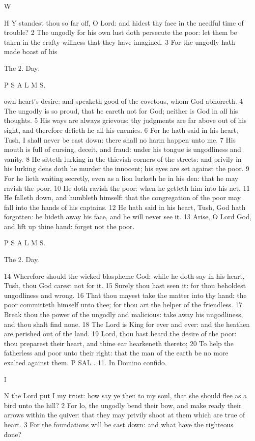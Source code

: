 W

H Y standest thou so far off, O Lord: and hidest thy face in the needful time of trouble? 2 The ungodly for his own lust doth persecute the poor: let them be taken in the crafty wiliness that they have imagined. 3 For the ungodly hath made boast of his

The 2. Day.

P S A L M S.

own heart's desire: and speaketh good of the covetous, whom God abhorreth. 4 The ungodly is so proud, that he careth not for God; neither is God in all his thoughts. 5 His ways are always grievous: thy judgments are far above out of his sight, and therefore defieth he all his enemies. 6 For he hath said in his heart, Tush, I shall never be cast down: there shall no harm happen unto me. 7 His mouth is full of cursing, deceit, and fraud: under his tongue is ungodliness and vanity. 8 He sitteth lurking in the thievish corners of the streets: and privily in his lurking dens doth he murder the innocent; his eyes are set against the poor. 9 For he lieth waiting secretly, even as a lion lurketh he in his den: that he may ravish the poor. 10 He doth ravish the poor: when he getteth him into his net. 11 He falleth down, and humbleth himself: that the congregation of the poor may fall into the hands of his captains. 12 He hath said in his heart, Tush, God hath forgotten: he hideth away his face, and he will never see it. 13 Arise, O Lord God, and lift up thine hand: forget not the poor.

P S A L M S.

The 2. Day.

14 Wherefore should the wicked blaspheme God: while he doth say in his heart, Tush, thou God carest not for it. 15 Surely thou hast seen it: for thou beholdest ungodliness and wrong. 16 That thou mayest take the matter into thy hand: the poor committeth himself unto thee; for thou art the helper of the friendless. 17 Break thou the power of the ungodly and malicious: take away his ungodliness, and thou shalt find none. 18 The Lord is King for ever and ever: and the heathen are perished out of the land. 19 Lord, thou hast heard the desire of the poor: thou preparest their heart, and thine ear hearkeneth thereto; 20 To help the fatherless and poor unto their right: that the man of the earth be no more exalted against them. P SAL . 11. In Domino confido.

I

N the Lord put I my trust: how say ye then to my soul, that she should flee as a bird unto the hill? 2 For lo, the ungodly bend their bow, and make ready their arrows within the quiver: that they may privily shoot at them which are true of heart. 3 For the foundations will be cast down: and what have the righteous done?

